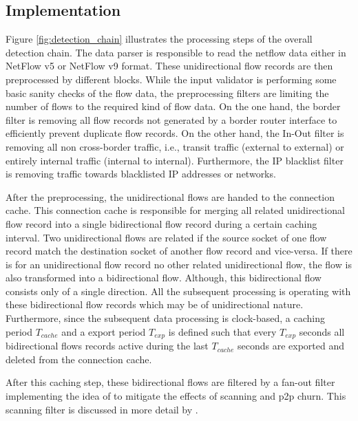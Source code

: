\subsection{Implementation}
Figure \ref{fig:detection_chain} illustrates the processing steps of the overall detection chain. The data parser is responsible to read the netflow data either in NetFlow v5 or NetFlow v9 format. These unidirectional flow records are then preprocessed by different blocks. While the input validator is performing some basic sanity checks of the flow data, the preprocessing filters are limiting the number of flows to the required kind of flow data. On the one hand, the border filter is removing all flow records not generated by a border router interface to efficiently prevent duplicate flow records. On the other hand, the In-Out filter is removing all non cross-border traffic, i.e., transit traffic (external to external) or entirely internal traffic (internal to internal). Furthermore, the IP blacklist filter is removing traffic towards blacklisted IP addresses or networks.

After the preprocessing, the unidirectional flows are handed to the connection cache. This connection cache is responsible for merging all related unidirectional flow record into a single bidirectional flow record during a certain caching interval. 
Two unidirectional flows are related if the source socket of one flow record match the destination socket of another flow record and vice-versa\citep{Schatzmann:Tracing}. If there is for an unidirectional flow record no other related unidirectional flow, the flow is also transformed into a bidirectional flow. Although, this bidirectional flow consists only of a single direction. All the subsequent processing is operating with these bidirectional flow records which may be of unidirectional nature. 
Furthermore, since the subsequent data processing is clock-based, a caching period $T_{cache}$ and a export period $T_{exp}$ is defined such that every $T_{exp}$ seconds all bidirectional flows records active during the last $T_{cache}$ seconds are exported and deleted from the connection cache.

After this caching step, these bidirectional flows are filtered by a fan-out filter implementing the idea of \citet{Allman:2007} to mitigate the effects of scanning and \gls{p2p} churn. This scanning filter is discussed in more detail by \citet{Schatzmann:Mining,Schatzmann:Dissection,Schatzmann:Tracing}.


